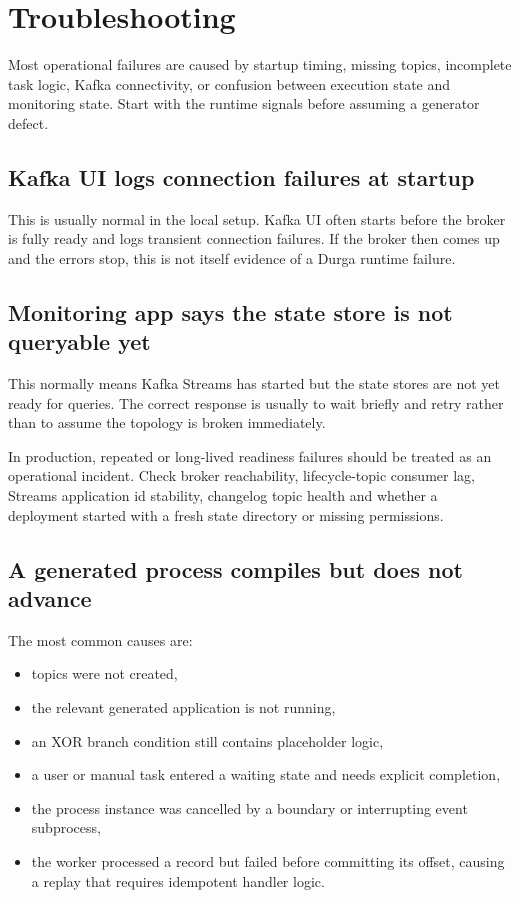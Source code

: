 \section{Troubleshooting}
\label{sec:Troubleshooting}

Most operational failures are caused by startup timing, missing topics,
incomplete task logic, Kafka connectivity, or confusion between execution state
and monitoring state. Start with the runtime signals before assuming a generator
defect.

\subsection{Kafka UI logs connection failures at startup}

This is usually normal in the local setup. Kafka UI often starts before the broker is fully
ready and logs transient connection failures. If the broker then comes up and the errors stop,
this is not itself evidence of a Durga runtime failure.

\subsection{Monitoring app says the state store is not queryable yet}

This normally means Kafka Streams has started but the state stores are not yet ready for queries.
The correct response is usually to wait briefly and retry rather than to assume the topology is
broken immediately.

In production, repeated or long-lived readiness failures should be treated as an
operational incident. Check broker reachability, lifecycle-topic consumer lag,
Streams application id stability, changelog topic health and whether a deployment
started with a fresh state directory or missing permissions.

\subsection{A generated process compiles but does not advance}

The most common causes are:
\begin{itemize}
\item topics were not created,
\item the relevant generated application is not running,
\item an XOR branch condition still contains placeholder logic,
\item a user or manual task entered a waiting state and needs explicit completion,
\item the process instance was cancelled by a boundary or interrupting event subprocess,
\item the worker processed a record but failed before committing its offset, causing
      a replay that requires idempotent handler logic.
\end{itemize}

